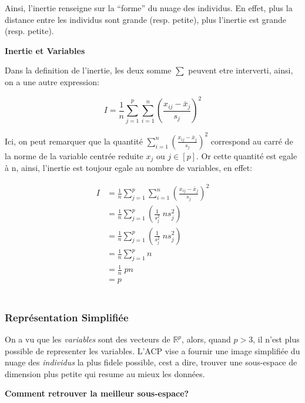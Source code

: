 \documentclass{article}
\begin{document}
Ainsi, l’inertie renseigne sur la ``forme'' du nuage des individus. En effet, plus la distance entre les individus sont grande (resp. petite), plus l'inertie est grande (resp. petite).

\begin{flushleft}
\textbf{Inertie et Variables}
\end{flushleft}

Dans la definition de l'inertie, les deux somme $\sum$ peuvent etre interverti, ainsi, on a une autre expression:

\begin{equation*}
I = \frac{1}{n} \sum_{j=1}^p \sum_{i=1}^n {\left( \frac{x_{ij}-\bar{x}_j}{s_j} \right)}^2
\end{equation*}

Ici, on peut remarquer que la quantité $\sum_{i=1}^n {\left( \frac{x_{ij}-\bar{x}_j}{s_j} \right)}^2$ correspond au carré de la norme de la variable centrée reduite $x_j$ ou $j \in [p]$. Or cette quantité est egale à n, ainsi, l'inertie est toujour egale au nombre de variables, en effet:

\begin{align*}
I &= \frac{1}{n} \sum_{j=1}^p \sum_{i=1}^n {\left( \frac{x_{ij}-\bar{x}_j}{s_j} \right)}^2 \\
  &= \frac{1}{n} \sum_{j=1}^p \left( \frac{1}{s_j^2} \; n{s_j^2} \right) \\  
  &= \frac{1}{n} \sum_{j=1}^p \left( \frac{1}{s_j^2} \; n{s_j^2} \right) \\
  &= \frac{1}{n} \sum_{j=1}^p n \\
  &= \frac{1}{n} \; pn \\
  &= p
\end{align*}
\\

\subsubsection{Représentation Simplifiée}

On a vu que les \textit{variables} sont des vecteurs de $\mathbb{R}^p$, alors, quand $p > 3$, il n'est plus possible de representer les variables. L'ACP vise a fournir une image simplifiée du nuage des \textit{individus} la plus fidele possible, cest a dire, trouver une sous-espace de dimension plus petite qui resume au mieux les données.
\newline

\newpage

\begin{flushleft}
\textbf{Comment retrouver la meilleur sous-espace?}
\end{flushleft}
\end{document}

